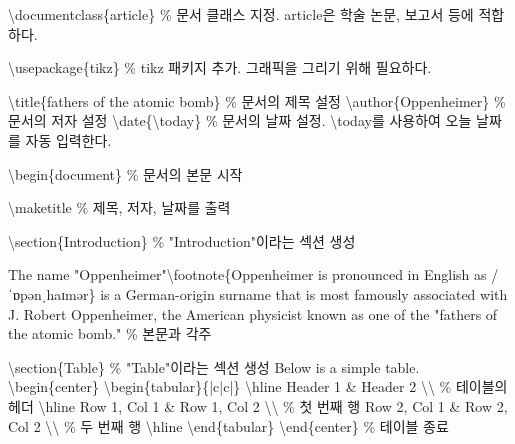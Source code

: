 \documentclass[
  letterpaper,
]{book}
\newenvironment{Shaded}{\begin{snugshade}}{\end{snugshade}}
\newcommand{\BuiltInTok}[1]{\textcolor[rgb]{0.00,0.23,0.31}{#1}}
\newcommand{\CommentTok}[1]{\textcolor[rgb]{0.37,0.37,0.37}{#1}}
\newcommand{\ExtensionTok}[1]{\textcolor[rgb]{0.00,0.23,0.31}{#1}}
\newcommand{\FunctionTok}[1]{\textcolor[rgb]{0.28,0.35,0.67}{#1}}
\newcommand{\KeywordTok}[1]{\textcolor[rgb]{0.00,0.23,0.31}{#1}}
\newcommand{\NormalTok}[1]{\textcolor[rgb]{0.00,0.23,0.31}{#1}}
\newcommand{\OperatorTok}[1]{\textcolor[rgb]{0.37,0.37,0.37}{#1}}
\begin{document}
\begin{Shaded}
\begin{Highlighting}[]
\BuiltInTok{\textbackslash{}documentclass}\NormalTok{\{}\ExtensionTok{article}\NormalTok{\}  }\CommentTok{\% 문서 클래스 지정. article은 학술 논문, 보고서 등에 적합하다.}

\BuiltInTok{\textbackslash{}usepackage}\NormalTok{\{}\ExtensionTok{tikz}\NormalTok{\}  }\CommentTok{\% tikz 패키지 추가. 그래픽을 그리기 위해 필요하다.}

\FunctionTok{\textbackslash{}title}\NormalTok{\{fathers of the atomic bomb\}  }\CommentTok{\% 문서의 제목 설정}
\FunctionTok{\textbackslash{}author}\NormalTok{\{Oppenheimer\}  }\CommentTok{\% 문서의 저자 설정}
\FunctionTok{\textbackslash{}date}\NormalTok{\{}\FunctionTok{\textbackslash{}today}\NormalTok{\}  }\CommentTok{\% 문서의 날짜 설정. \textbackslash{}today를 사용하여 오늘 날짜를 자동 입력한다.}

\KeywordTok{\textbackslash{}begin}\NormalTok{\{}\ExtensionTok{document}\NormalTok{\}  }\CommentTok{\% 문서의 본문 시작}

\FunctionTok{\textbackslash{}maketitle}  \CommentTok{\% 제목, 저자, 날짜를 출력}

\KeywordTok{\textbackslash{}section}\NormalTok{\{Introduction\}  }\CommentTok{\% "Introduction"이라는 섹션 생성}

\NormalTok{The name "Oppenheimer"}\FunctionTok{\textbackslash{}footnote}\NormalTok{\{Oppenheimer is pronounced in English as /ˈɒpənˌhaɪmər\} is a German{-}origin surname that is most famously associated with J. Robert Oppenheimer, the American physicist known as one of the "fathers of the atomic bomb."  }\CommentTok{\% 본문과 각주}

\KeywordTok{\textbackslash{}section}\NormalTok{\{Table\}  }\CommentTok{\% "Table"이라는 섹션 생성}
\NormalTok{Below is a simple table.}
\KeywordTok{\textbackslash{}begin}\NormalTok{\{}\ExtensionTok{center}\NormalTok{\}}
\KeywordTok{\textbackslash{}begin}\NormalTok{\{}\ExtensionTok{tabular}\NormalTok{\}\{|c|c|\}}
\FunctionTok{\textbackslash{}hline}
\NormalTok{Header 1 }\OperatorTok{\&}\NormalTok{ Header 2 }\FunctionTok{\textbackslash{}\textbackslash{}}  \CommentTok{\% 테이블의 헤더}
\FunctionTok{\textbackslash{}hline}
\NormalTok{Row 1, Col 1 }\OperatorTok{\&}\NormalTok{ Row 1, Col 2 }\FunctionTok{\textbackslash{}\textbackslash{}}  \CommentTok{\% 첫 번째 행}
\NormalTok{Row 2, Col 1 }\OperatorTok{\&}\NormalTok{ Row 2, Col 2 }\FunctionTok{\textbackslash{}\textbackslash{}}  \CommentTok{\% 두 번째 행}
\FunctionTok{\textbackslash{}hline}
\KeywordTok{\textbackslash{}end}\NormalTok{\{}\ExtensionTok{tabular}\NormalTok{\}}
\KeywordTok{\textbackslash{}end}\NormalTok{\{}\ExtensionTok{center}\NormalTok{\}  }\CommentTok{\% 테이블 종료}


\end{Highlighting}
\end{Shaded}
\end{document}
